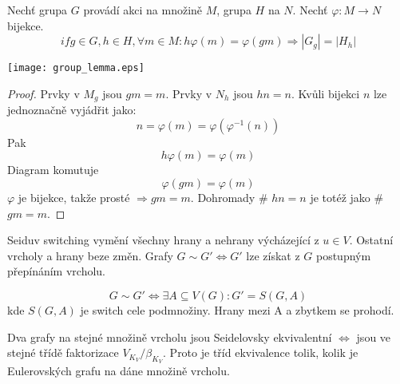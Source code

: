 \begin{theorem}
\end{theorem}

\begin{lemma}
Nechť grupa $G$ provádí akci na množině $M$, grupa $H$ na $N$. Nechť $\varphi:M \to N$ bijekce.
	\[ if g \in G, h \in H, \forall m \in M: h\varphi(m) = \varphi(gm) \Rightarrow |G_{g}| = |H_{h}| \]

	\texttt{[image: group\_lemma.eps]}
\end{lemma}
\begin{proof}
Prvky v $M_g$ jsou $gm = m$. Prvky v $N_h$ jsou $hn = n$. Kvůli bijekci $n$ lze jednoznačně vyjádřit jako:
\[ n = \varphi(m) = \varphi(\varphi^{-1}(n)) \]
Pak
\[ h\varphi(m) = \varphi(m) \]
Diagram komutuje
\[ \varphi(gm) = \varphi(m) \]
$\varphi$ je bijekce, takže prosté $\Rightarrow gm = m$. Dohromady \# $hn = n$ je totéž jako \# $gm = m$.
\end{proof}

\begin{definition}
Seiduv switching vymění všechny hrany a nehrany výcházející z $u \in V$. Ostatní vrcholy a hrany beze změn. Grafy $G \sim G' \iff G'$ lze získat z $G$ postupným přepínáním vrcholu.
\end{definition}

\begin{note}
	\[ G \sim G' \iff \exists A \subseteq V(G): G' = S(G,A) \]
	kde $S(G,A)$ je switch cele podmnožiny. Hrany mezi A a zbytkem se prohodí.
\end{note}

\begin{note}
	Dva grafy na stejné množině vrcholu jsou Seidelovsky ekvivalentní $\iff$ jsou ve stejné třídě faktorizace $V_{K_V}/ \beta_{K_V}$.
	Proto je tříd ekvivalence tolik, kolik je Eulerovských grafu na dáne množině vrcholu.
\end{note}

